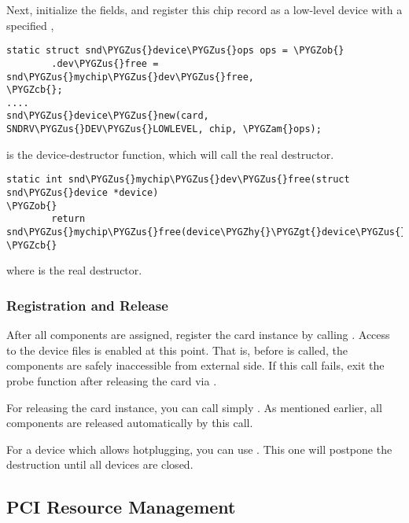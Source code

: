 \documentclass[a4paper,8pt,english]{sphinxmanual}
\def\PYGZus{\char`\_}
\def\PYGZob{\char`\{}
\def\PYGZcb{\char`\}}
\def\PYGZam{\char`\&}
\def\PYGZgt{\char`\>}
\def\PYGZhy{\char`\-}
\begin{document}
Next, initialize the fields, and register this chip record as a
low-level device with a specified ,

\begin{Verbatim}[commandchars=\\\{\}]
static struct snd\PYGZus{}device\PYGZus{}ops ops = \PYGZob{}
        .dev\PYGZus{}free =        snd\PYGZus{}mychip\PYGZus{}dev\PYGZus{}free,
\PYGZcb{};
....
snd\PYGZus{}device\PYGZus{}new(card, SNDRV\PYGZus{}DEV\PYGZus{}LOWLEVEL, chip, \PYGZam{}ops);
\end{Verbatim}

 is the device-destructor
function, which will call the real destructor.

\begin{Verbatim}[commandchars=\\\{\}]
static int snd\PYGZus{}mychip\PYGZus{}dev\PYGZus{}free(struct snd\PYGZus{}device *device)
\PYGZob{}
        return snd\PYGZus{}mychip\PYGZus{}free(device\PYGZhy{}\PYGZgt{}device\PYGZus{}data);
\PYGZcb{}
\end{Verbatim}

where  is the real destructor.


\subsubsection{Registration and Release}
\label{sound/kernel-api/writing-an-alsa-driver:registration-and-release}
After all components are assigned, register the card instance by calling
. Access to the device files is
enabled at this point. That is, before
 is called, the components are safely
inaccessible from external side. If this call fails, exit the probe
function after releasing the card via .

For releasing the card instance, you can call simply
. As mentioned earlier, all components
are released automatically by this call.

For a device which allows hotplugging, you can use
. This one will postpone
the destruction until all devices are closed.


\subsection{PCI Resource Management}
\label{sound/kernel-api/writing-an-alsa-driver:pci-resource-management}
\end{document}
